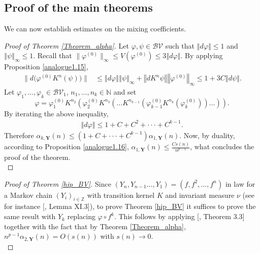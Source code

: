 \documentclass{ws-sd}
\newcommand{\norm}[1]{\left\Vert #1\right\Vert}
\begin{document}
\subsection{Proof of the main theorems}
We can now establish estimates on the mixing coefficients.
\begin{proof}[Proof of Theorem \ref{Theorem_alpha}]
    Let $\varphi, \psi \in \mathcal{BV}$ such that $\norm{d\varphi} \le 1$ and $\norm{\psi}_{\infty} \le 1$. Recall that $ \lVert \varphi^{(0)}\rVert_\infty \le V(\varphi^{(0)}) \le 3\norm{d\varphi}$. By applying Proposition \ref{analogue1.15},
    \begin{align*}
        \lVert d\big( \varphi^{(0)}K^n(\psi)\big)\rVert
        &\le \norm{d\varphi} \norm{\psi}_{\infty} + \norm{dK^n\psi} \norm{\varphi^{(0)}}_{\infty}
        \le 1 + 3C\norm{d\psi}.
    \end{align*}
    Let $\varphi_1,\ldots,\varphi_k \in \mathcal{BV}_1$, $n_1,\ldots,n_k \in \mathbb{N}$ and set
    $$
        \varphi = \varphi_1^{(0)}K^{n_2}(\varphi_2^{(0)}K^{n_3}(\ldots K^{n_{k-1}}(\varphi_{k-1}^{(0)}K^{n_k}(\varphi_k^{(0)}))\ldots)).
    $$
    By iterating the above inequality,
    \begin{align*}
        \norm{d\varphi} \le 1 + C + C^2 +\cdot \cdot \cdot+ C^{k-1}.
    \end{align*}
    Therefore $ \alpha_{k, \mathbf Y}(n) \le (1+ C+\cdot \cdot \cdot+ C^{k-1}) \alpha_{1, \mathbf Y}(n)$. Now, by duality, according to Proposition \ref{analogue1.16}, $\alpha_{1, \mathbf Y}(n) \le \frac{Cs(n)}{n^{p-1}}$, what concludes the proof of the theorem.
    \\
\end{proof}

\begin{proof}[Proof of Theorem \ref{hip_BV}]
    Since $(Y_n,Y_{n-1}\ldots,Y_1) = (f, f^2,\ldots, f^n)$ in law for a Markov chain $(Y_i)_{i \in \mathbb{Z}}$ with transition kernel $K$ and invariant measure $\nu$ (see for instance [, Lemma XI.3]), to prove Theorem \ref{hip_BV} it suffices to prove the same result with $Y_k$ replacing $\varphi \circ f^k$. This follows by applying [, Theorem 3.3] together with the fact that by Theorem \ref{Theorem_alpha}, $n^{p-1}\alpha_{2, \mathbf Y}(n) = O(s(n))$ with $s(n) \longrightarrow 0$.
    \\
\end{proof}
\end{document}
